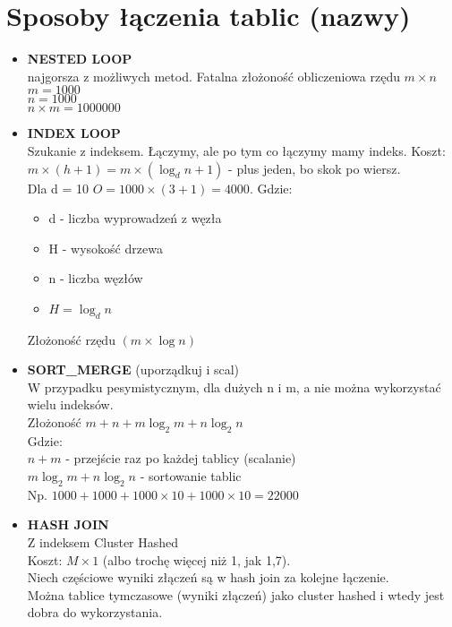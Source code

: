 \documentclass[a4paper,twoside]{article}
\begin{document}
  	\section*{Sposoby łączenia tablic (nazwy)}
  	\begin{itemize}
  		\item \textbf{NESTED LOOP}\\
  		najgorsza z możliwych metod. Fatalna złożoność obliczeniowa rzędu $ m \times n $\\
  		\(m=1000\)\\\(n=1000\)\\\(n\times{m}=1000000\)
  		\item \textbf{INDEX LOOP}\\
  		Szukanie z indeksem. Łączymy, ale po tym co łączymy mamy indeks. Koszt: 
  		\(m\times({h}+1)=m\times{(\log_d n+1)}\) - plus jeden, bo skok po wiersz.\\
  		Dla d = 10 \(O=1000\times{(3+1)}=4000\). Gdzie:
  		\begin{itemize}
  			\item d - liczba wyprowadzeń z węzła
  			\item H - wysokość drzewa
  			\item n - liczba węzłów
  			\item $ H=\log_d n $
  		\end{itemize}
  		Złożoność rzędu \((m\times\log{n})\)
  		\item \textbf{SORT\_MERGE} (uporządkuj i scal)\\
  		W przypadku pesymistycznym, dla dużych n i m, a nie można wykorzystać wielu indeksów.\\
  		Złożoność \(m+n+m\log_2 m+n\log_2 n\)\\
  		Gdzie:\\
  		\(n+m\) - przejście raz po każdej tablicy (scalanie)\\
  		\(m\log_2 m+n\log_2 n\) - sortowanie tablic\\
  		Np. $ 1000 + 1000 + 1000\times10 + 1000\times10 = 22 000 $
  		\item \textbf{HASH JOIN}\\
  		Z indeksem Cluster Hashed\\
  		Koszt: $ M\times1 $ (albo trochę więcej niż 1, jak 1,7).\\
  		Niech częściowe wyniki złączeń są w hash join za kolejne łączenie.\\
  		Można tablice tymczasowe (wyniki złączeń) jako cluster hashed i wtedy jest dobra do wykorzystania.
  	\end{itemize}
  	
\end{document}
